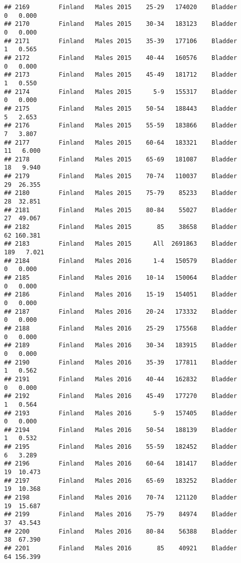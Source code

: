\documentclass[
]{article}
\begin{document}
\begin{verbatim}
## 2169        Finland   Males 2015    25-29   174020    Bladder      0   0.000
## 2170        Finland   Males 2015    30-34   183123    Bladder      0   0.000
## 2171        Finland   Males 2015    35-39   177106    Bladder      1   0.565
## 2172        Finland   Males 2015    40-44   160576    Bladder      0   0.000
## 2173        Finland   Males 2015    45-49   181712    Bladder      1   0.550
## 2174        Finland   Males 2015      5-9   155317    Bladder      0   0.000
## 2175        Finland   Males 2015    50-54   188443    Bladder      5   2.653
## 2176        Finland   Males 2015    55-59   183866    Bladder      7   3.807
## 2177        Finland   Males 2015    60-64   183321    Bladder     11   6.000
## 2178        Finland   Males 2015    65-69   181087    Bladder     18   9.940
## 2179        Finland   Males 2015    70-74   110037    Bladder     29  26.355
## 2180        Finland   Males 2015    75-79    85233    Bladder     28  32.851
## 2181        Finland   Males 2015    80-84    55027    Bladder     27  49.067
## 2182        Finland   Males 2015       85    38658    Bladder     62 160.381
## 2183        Finland   Males 2015      All  2691863    Bladder    189   7.021
## 2184        Finland   Males 2016      1-4   150579    Bladder      0   0.000
## 2185        Finland   Males 2016    10-14   150064    Bladder      0   0.000
## 2186        Finland   Males 2016    15-19   154051    Bladder      0   0.000
## 2187        Finland   Males 2016    20-24   173332    Bladder      0   0.000
## 2188        Finland   Males 2016    25-29   175568    Bladder      0   0.000
## 2189        Finland   Males 2016    30-34   183915    Bladder      0   0.000
## 2190        Finland   Males 2016    35-39   177811    Bladder      1   0.562
## 2191        Finland   Males 2016    40-44   162832    Bladder      0   0.000
## 2192        Finland   Males 2016    45-49   177270    Bladder      1   0.564
## 2193        Finland   Males 2016      5-9   157405    Bladder      0   0.000
## 2194        Finland   Males 2016    50-54   188139    Bladder      1   0.532
## 2195        Finland   Males 2016    55-59   182452    Bladder      6   3.289
## 2196        Finland   Males 2016    60-64   181417    Bladder     19  10.473
## 2197        Finland   Males 2016    65-69   183252    Bladder     19  10.368
## 2198        Finland   Males 2016    70-74   121120    Bladder     19  15.687
## 2199        Finland   Males 2016    75-79    84974    Bladder     37  43.543
## 2200        Finland   Males 2016    80-84    56388    Bladder     38  67.390
## 2201        Finland   Males 2016       85    40921    Bladder     64 156.399

\end{verbatim}
\end{document}
